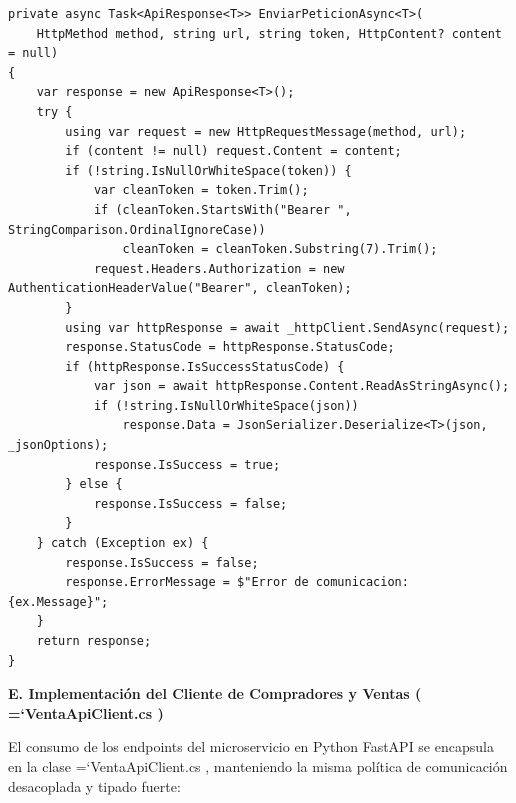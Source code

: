 \documentclass[11pt,a4paper]{article}
\renewcommand{\_}{\oldunderscore\allowbreak}
\DeclareRobustCommand{\texttt}[1]{%
  {\upshape\ttfamily\fontsize{9}{10.8}\selectfont\hyphenchar\font=`\-\relax #1}%
}
\begin{document}
\begin{lstlisting}
private async Task<ApiResponse<T>> EnviarPeticionAsync<T>(
    HttpMethod method, string url, string token, HttpContent? content = null)
{
    var response = new ApiResponse<T>();
    try {
        using var request = new HttpRequestMessage(method, url);
        if (content != null) request.Content = content;
        if (!string.IsNullOrWhiteSpace(token)) {
            var cleanToken = token.Trim();
            if (cleanToken.StartsWith("Bearer ", StringComparison.OrdinalIgnoreCase))
                cleanToken = cleanToken.Substring(7).Trim();
            request.Headers.Authorization = new AuthenticationHeaderValue("Bearer", cleanToken);
        }
        using var httpResponse = await _httpClient.SendAsync(request);
        response.StatusCode = httpResponse.StatusCode;
        if (httpResponse.IsSuccessStatusCode) {
            var json = await httpResponse.Content.ReadAsStringAsync();
            if (!string.IsNullOrWhiteSpace(json))
                response.Data = JsonSerializer.Deserialize<T>(json, _jsonOptions);
            response.IsSuccess = true;
        } else {
            response.IsSuccess = false;
        }
    } catch (Exception ex) {
        response.IsSuccess = false;
        response.ErrorMessage = $"Error de comunicacion: {ex.Message}";
    }
    return response;
}
\end{lstlisting}

\vspace{0.2cm}
\noindent\textbf{E. Implementación del Cliente de Compradores y Ventas (\texttt{VentaApiClient.\allowbreak{}cs})}

\noindent El consumo de los endpoints del microservicio en Python FastAPI se encapsula en la clase \texttt{VentaApiClient.\allowbreak{}cs}, manteniendo la misma política de comunicación desacoplada y tipado fuerte:
\end{document}
